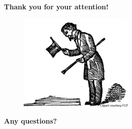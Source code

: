 \documentclass{beamer}
\begin{document}
{\begin{frame}[plain,c]
	\begin{Large}
		\begin{center}
			\textbf{Thank you for your attention!}
		\end{center}
	\end{Large}	
	\begin{figure}[H]
		\centering
		\includegraphics[width=0.5\textwidth]{figures/final}
	\end{figure}
	\begin{Large}
		\begin{center}
			\textbf{Any questions?}
		\end{center}
	\end{Large}	
\end{frame}



}
\end{document}

